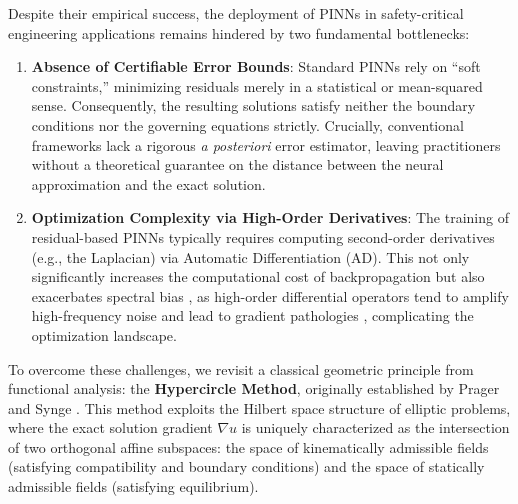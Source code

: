 \documentclass[12pt, a4paper]{article}
\begin{document}
Despite their empirical success, the deployment of PINNs in safety-critical engineering applications remains hindered by two fundamental bottlenecks:
\begin{enumerate}
    \item \textbf{Absence of Certifiable Error Bounds}: Standard PINNs rely on ``soft constraints,'' minimizing residuals merely in a statistical or mean-squared sense. Consequently, the resulting solutions satisfy neither the boundary conditions nor the governing equations strictly. Crucially, conventional frameworks lack a rigorous \textit{a posteriori} error estimator, leaving practitioners without a theoretical guarantee on the distance between the neural approximation and the exact solution.
    \item \textbf{Optimization Complexity via High-Order Derivatives}: The training of residual-based PINNs typically requires computing second-order derivatives (e.g., the Laplacian) via Automatic Differentiation (AD). This not only significantly increases the computational cost of backpropagation but also exacerbates spectral bias \cite{rahaman2019spectral}, as high-order differential operators tend to amplify high-frequency noise and lead to gradient pathologies \cite{wang2021understanding}, complicating the optimization landscape.
\end{enumerate}

To overcome these challenges, we revisit a classical geometric principle from functional analysis: the \textbf{Hypercircle Method}, originally established by Prager and Synge \cite{prager1947}.  This method exploits the Hilbert space structure of elliptic problems, where the exact solution gradient $\nabla u$ is uniquely characterized as the intersection of two orthogonal affine subspaces: the space of kinematically admissible fields (satisfying compatibility and boundary conditions) and the space of statically admissible fields (satisfying equilibrium).
\end{document}
